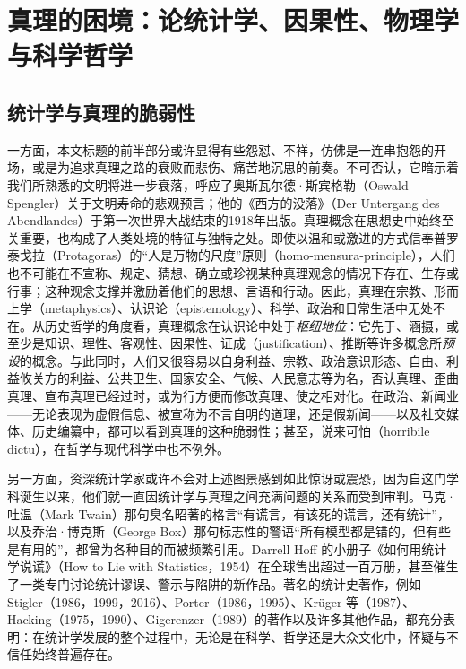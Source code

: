 \chapter{真理的困境：论统计学、因果性、\mbox{物理学与科学哲学}}
\label{ch:predicament-of-truth}

\section{统计学与真理的脆弱性}

一方面，本文标题的前半部分或许显得有些怨怼、不祥，仿佛是一连串抱怨的开场，或是为追求真理之路的衰败而悲伤、痛苦地沉思的前奏。不可否认，它暗示着我们所熟悉的文明将进一步衰落，呼应了奥斯瓦尔德·斯宾格勒（Oswald Spengler）关于文明寿命的悲观预言；他的《西方的没落》（Der Untergang des Abendlandes）于第一次世界大战结束的1918年出版。真理概念在思想史中始终至关重要，也构成了人类处境的特征与独特之处。即使以温和或激进的方式信奉普罗泰戈拉（Protagoras）的“人是万物的尺度”原则（homo-mensura-principle），人们也不可能在不宣称、规定、猜想、确立或珍视某种真理观念的情况下存在、生存或行事；这种观念支撑并激励着他们的思想、言语和行动。因此，真理在宗教、形而上学（metaphysics）、认识论（epistemology）、科学、政治和日常生活中无处不在。从历史哲学的角度看，真理概念在认识论中处于\emph{枢纽地位}：它先于、涵摄，或至少是知识、理性、客观性、因果性、证成（justification）、推断等许多概念所\emph{预设}的概念。与此同时，人们又很容易以自身利益、宗教、政治意识形态、自由、利益攸关方的利益、公共卫生、国家安全、气候、人民意志等为名，否认真理、歪曲真理、宣布真理已经过时，或为行方便而修改真理、使之相对化。在政治、新闻业——无论表现为虚假信息、被宣称为不言自明的道理，还是假新闻——以及社交媒体、历史编纂中，都可以看到真理的这种脆弱性；甚至，说来可怕（horribile dictu），在哲学与现代科学中也不例外。

另一方面，资深统计学家或许不会对上述图景感到如此惊讶或震恐，因为自这门学科诞生以来，他们就一直因统计学与真理之间充满问题的关系而受到审判。马克·吐温（Mark Twain）那句臭名昭著的格言“有谎言，有该死的谎言，还有统计”，以及乔治·博克斯（George Box）那句标志性的警语“所有模型都是错的，但有些是有用的”，都曾为各种目的而被频繁引用。Darrell Hoff 的小册子《如何用统计学说谎》（How to Lie with Statistics，1954）在全球售出超过一百万册，甚至催生了一类专门讨论统计谬误、警示与陷阱的新作品。著名的统计史著作，例如 Stigler（1986，1999，2016）、Porter（1986，1995）、Krüger 等（1987）、Hacking（1975，1990）、Gigerenzer（1989）的著作以及许多其他作品，都充分表明：在统计学发展的整个过程中，无论是在科学、哲学还是大众文化中，怀疑与不信任始终普遍存在。

